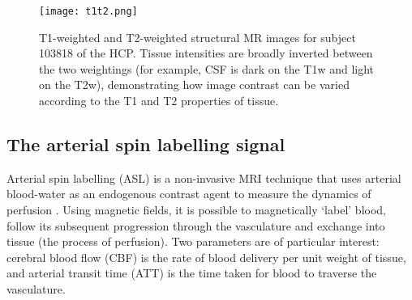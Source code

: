 
\begin{figure}[h]
\centering
\texttt{[image: t1t2.png]}
\caption{T1-weighted and T2-weighted structural MR images for subject 103818 of the HCP. Tissue intensities are broadly inverted between the two weightings (for example, CSF is dark on the T1w and light on the T2w), demonstrating how image contrast can be varied according to the T1 and T2 properties of tissue.}
\label{t1t2_image}
\end{figure}


\subsection{The arterial spin labelling signal}

Arterial spin labelling (ASL) is a non-invasive MRI technique that uses arterial blood-water as an endogenous contrast agent to measure the dynamics of perfusion \cite{Alsop2015}. Using magnetic fields, it is possible to magnetically `label' blood, follow its subsequent progression through the vasculature and exchange into tissue (the process of perfusion). Two parameters are of particular interest: cerebral blood flow (CBF) is the rate of blood delivery per unit weight of tissue, and arterial transit time (ATT) is the time taken for blood to traverse the vasculature.  

